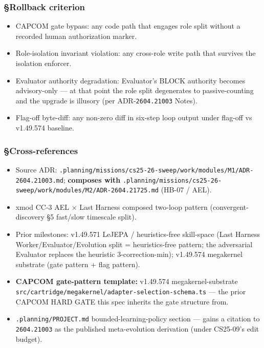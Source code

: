 \documentclass[11pt,letterpaper]{article}
\newcommand{\arxivid}[1]{\texttt{\textcolor{accent}{#1}}}
\providecommand{\tightlist}{\setlength{\itemsep}{0pt}\setlength{\parskip}{0pt}}
\begin{document}
\subsubsection{§Rollback criterion}

\begin{itemize}
\tightlist
\item
  CAPCOM gate bypass: any code path that engages role split without a
  recorded human authorization marker.
\item
  Role-isolation invariant violation: any cross-role write path that
  survives the isolation enforcer.
\item
  Evaluator authority degradation: Evaluator's BLOCK authority becomes
  advisory-only --- at that point the role split degenerates to
  passive-counting and the upgrade is illusory (per ADR-\arxivid{2604.21003}
  Notes).
\item
  Flag-off byte-diff: any non-zero diff in six-step loop output under
  flag-off vs v1.49.574 baseline.
\end{itemize}

\subsubsection{§Cross-references}

\begin{itemize}
\tightlist
\item
  Source ADR:
  \texttt{.planning/missions/cs25-26-sweep/work/modules/M1/ADR-\arxivid{2604.21003}.md};
  \textbf{composes with}
  \texttt{.planning/missions/cs25-26-sweep/work/modules/M2/ADR-\arxivid{2604.21725}.md}
  (HB-07 / AEL).
\item
  xmod CC-3 AEL × Last Harness composed two-loop pattern
  (convergent-discovery §5 fast/slow timescale split).
\item
  Prior milestones: v1.49.571 LeJEPA / heuristics-free skill-space (Last
  Harness Worker/Evaluator/Evolution split = heuristics-free pattern;
  the adversarial Evaluator replaces the heuristic 3-correction-min);
  v1.49.574 megakernel substrate (gate pattern + flag pattern).
\item
  \textbf{CAPCOM gate-pattern template:} v1.49.574 megakernel-substrate
  \texttt{src/cartridge/megakernel/adapter-selection-schema.ts} --- the
  prior CAPCOM HARD GATE this spec inherits the gate structure from.
\item
  \texttt{.planning/PROJECT.md} bounded-learning-policy section ---
  gains a citation to \arxivid{2604.21003} as the published
  meta-evolution derivation (under CS25-09's edit budget).
\end{itemize}
\end{document}
